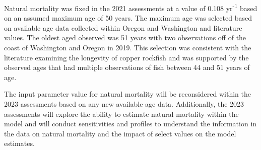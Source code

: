 \documentclass[
]{article}
\begin{document}
Natural mortality was fixed in the 2021 assessments at a value of 0.108
yr\textsuperscript{-1} based on an assumed maximum age of 50 years. The
maximum age was selected based on available age data collected within
Oregon and Washington and literature values. The oldest aged observed
was 51 years with two observations off of the coast of Washington and
Oregon in 2019. This selection was consistent with the literature
examining the longevity of copper rockfish and was supported by the
observed ages that had multiple observations of fish between 44 and 51
years of age.

The input parameter value for natural mortality will be reconsidered
within the 2023 assessments based on any new available age data.
Additionally, the 2023 assessments will explore the ability to estimate
natural mortality within the model and will conduct sensitivities and
profiles to understand the information in the data on natural mortality
and the impact of select values on the model estimates.
\end{document}
